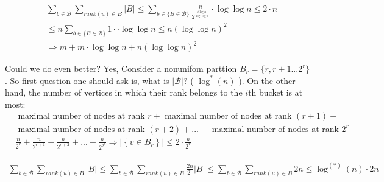 \begin{equation*}
  \begin{split}
    & \sum_{ b \in \mathcal{B} }{ \sum_{ rank(u) \in B}{ |B| } }  \le \sum_{ b \in \{ B \in \mathcal{B}  \}  }{ \frac{n}{2^{ \frac{  i \log n} { \log \log n  }  }} \cdot \log \log n }    \le  2\cdot n \\ 
    & \le n  \sum_{ b \in \{ B \in \mathcal{B}  \}  }{ 1 \cdot  \cdot \log \log n }    \le  n \left( \log \log n  \right)^{2}   \\
    & \Rightarrow m + m \cdot \log \log n + n \left( \log \log n  \right)^{2}  
  \end{split}
\end{equation*}

Could we do even better? Yes, Consider a nonunifom parttion $ B_{r} = \{ r,  r+ 1 ... 2^{r} \} $. So first question one should ask is, what is $ |\mathcal{B}|$? ( $ \log^{*}\left( n \right) $ ). On the other hand, the number of vertices in which their rank belongs to the $i$th bucket is at most:    
\begin{equation*}
  \begin{split}
    & \text{ maximal number of nodes at rank } r + \text{ maximal number of nodes at rank } (r+1) + \\ 
    & \text{ maximal number of nodes at rank } (r+2) + ... +  \text{ maximal number of nodes at rank } 2^{r} \\  
    & \frac{n}{2^{r}} + \frac{n}{2^{r+1}} + \frac{n}{2^{r+2}} + ... + \frac{n}{2^{2^{r}}} \Rightarrow | \left\{ v \in B_{r} \right\} | \le 2 \cdot \frac{n}{2^{r}} 
  \end{split}
\end{equation*}

\begin{equation*}
  \begin{split}
    \sum_{ b \in \mathcal{B} }{ \sum_{ rank(u) \in B}{ |B| } }  \le  \sum_{ b \in \mathcal{B} }{ \sum_{ rank(u) \in B}{ \frac{2n}{2^{r}} |B|  } }  \le \sum_{ b \in \mathcal{B} }{ \sum_{ rank(u) \in B}{ 2n } } \le \log^{(*)}\left( n \right) \cdot 2n 
  \end{split}
\end{equation*}






